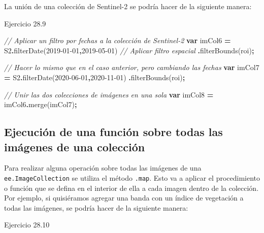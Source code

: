 \documentclass[
  12pt,
  letterpaper,
  twoside]{book}
\newenvironment{Shaded}{\begin{snugshade}}{\end{snugshade}}
\newcommand{\CommentTok}[1]{\textcolor[rgb]{0.56,0.35,0.01}{\textit{#1}}}
\newcommand{\FunctionTok}[1]{\textcolor[rgb]{0.00,0.00,0.00}{#1}}
\newcommand{\KeywordTok}[1]{\textcolor[rgb]{0.13,0.29,0.53}{\textbf{#1}}}
\newcommand{\NormalTok}[1]{#1}
\newcommand{\OperatorTok}[1]{\textcolor[rgb]{0.81,0.36,0.00}{\textbf{#1}}}
\newcommand{\StringTok}[1]{\textcolor[rgb]{0.31,0.60,0.02}{#1}}
\begin{document}
La unión de una colección de Sentinel-2 se podría hacer de la siguiente manera:

Ejercicio 28.9

\begin{Shaded}
\begin{Highlighting}[]
\CommentTok{// Aplicar un filtro por fechas a la colección de Sentinel{-}2}
\KeywordTok{var}\NormalTok{ imCol6 }\OperatorTok{=}\NormalTok{ S2}\OperatorTok{.}\FunctionTok{filterDate}\NormalTok{(}\StringTok{\textquotesingle{}2019{-}01{-}01\textquotesingle{}}\OperatorTok{,}\StringTok{\textquotesingle{}2019{-}05{-}01\textquotesingle{}}\NormalTok{)}
  \CommentTok{// Aplicar filtro espacial}
  \OperatorTok{.}\FunctionTok{filterBounds}\NormalTok{(roi)}\OperatorTok{;}

\CommentTok{// Hacer lo mismo que en el caso anterior, pero cambiando las fechas}
\KeywordTok{var}\NormalTok{ imCol7 }\OperatorTok{=}\NormalTok{ S2}\OperatorTok{.}\FunctionTok{filterDate}\NormalTok{(}\StringTok{\textquotesingle{}2020{-}06{-}01\textquotesingle{}}\OperatorTok{,}\StringTok{\textquotesingle{}2020{-}11{-}01\textquotesingle{}}\NormalTok{)}
  \OperatorTok{.}\FunctionTok{filterBounds}\NormalTok{(roi)}\OperatorTok{;}

\CommentTok{// Unir las dos colecciones de imágenes en una sola  }
\KeywordTok{var}\NormalTok{ imCol8 }\OperatorTok{=}\NormalTok{ imCol6}\OperatorTok{.}\FunctionTok{merge}\NormalTok{(imCol7)}\OperatorTok{;}
\end{Highlighting}
\end{Shaded}

\hypertarget{ejecuciuxf3n-de-una-funciuxf3n-sobre-todas-las-imuxe1genes-de-una-colecciuxf3n}{%
\subsection{Ejecución de una función sobre todas las imágenes de una colección}\label{ejecuciuxf3n-de-una-funciuxf3n-sobre-todas-las-imuxe1genes-de-una-colecciuxf3n}}

Para realizar alguna operación sobre todas las imágenes de una \texttt{ee.ImageCollection} se utiliza el método \texttt{.map}. Esto va a aplicar el procedimiento o función que se defina en el interior de ella a cada imagen dentro de la colección. Por ejemplo, si quisiéramos agregar una banda con un índice de vegetación a todas las imágenes, se podría hacer de la siguiente manera:

Ejercicio 28.10
\end{document}
